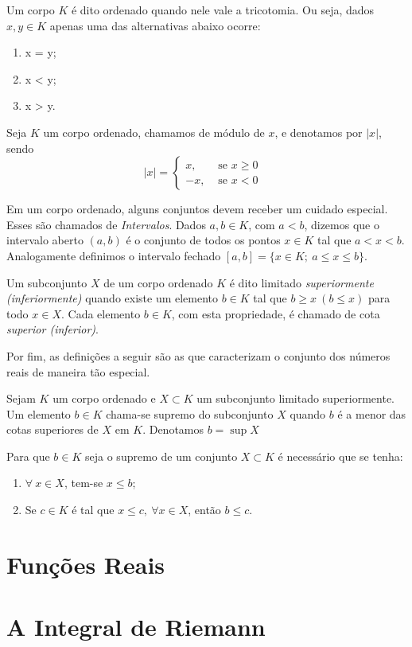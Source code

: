 \begin{definition}
    Um corpo $K$ é dito ordenado quando nele vale a tricotomia. Ou seja, dados $x, y \in K$ apenas uma das alternativas abaixo ocorre:
    \begin{enumerate}[label* = (\roman*)]
        \item x = y;
        \item x < y;
        \item x > y.
    \end{enumerate}
\end{definition}

\begin{definition}
    Seja $K$ um corpo ordenado, chamamos de módulo de $x$, e denotamos por $|x|$, sendo
    $$|x| = \left\{\begin{array}{cc}
        x, & \textrm{\ se $x \geq 0$\ }  \\
        -x, &\textrm{\ se $x <0$\ } 
    \end{array}\right.$$
\end{definition}

Em um corpo ordenado, alguns conjuntos devem receber um cuidado especial. Esses são chamados de \textit{Intervalos}.
Dados $a,b \in K$, com $a < b$, dizemos que o intervalo aberto $(a,b)$ é o conjunto de todos os pontos $x \in K$ tal que $a < x< b$. 
Analogamente definimos o intervalo fechado $[a,b] = \{x \in K; \ a \leq x \leq b\}$.



Um subconjunto $X$ de um corpo ordenado $K$ é dito limitado \textit{superiormente (inferiormente)} quando existe um elemento $b \in K$ tal que $b \geq x \ (b\leq x)$ para todo $x \in X$. Cada elemento $b \in K$, com esta propriedade, é chamado de cota \textit{superior (inferior)}.

Por fim, as definições a seguir são as que caracterizam o conjunto dos números reais de maneira tão especial.

\begin{definition}
    Sejam $K$ um corpo ordenado e $X \subset K$ um subconjunto limitado superiormente.
    Um elemento $b \in K$ chama-se supremo do subconjunto $X$ quando $b$ é a menor das cotas superiores de $X$ em $K$.
    Denotamos $b = \sup{X}$
\end{definition}

Para que $b \in K$ seja o supremo de um conjunto $X \subset K$ é necessário que se tenha:
\begin{enumerate}
    \item $\forall \ x \in X$, tem-se $x \leq b$;
    \item Se $c \in K$ é tal que $x \leq c, \ \forall x \in X$, então $b\leq c$.
    
\end{enumerate}


\section{Funções Reais} 
\section{A Integral de Riemann}
